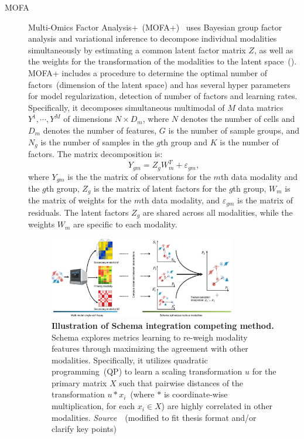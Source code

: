 \begin{description}
  \item[MOFA]
  Multi-Omics Factor Analysis+~(MOFA+)~\citep{argelaguet2020mofa+} uses Bayesian group factor analysis and variational inference to decompose individual modalities simultaneously by estimating a common latent factor matrix $Z$, as well as the weights for the transformation of the modalities to the latent space~(). MOFA+ includes a procedure to determine the optimal number of factors~(dimension of the latent space) and has several hyper parameters for model regularization, detection of number of factors and learning rates. Specifically, it decomposes simultaneous multimodal of $M$ data matrics $Y^1, \cdots, Y^M$ of dimensions $N\times D_m$, where $N$ denotes the number of cells and $D_m$ denotes the number of features, $G$ is the number of sample groups, and $N_g$ is the number of samples in the $g$th group and $K$ is the number of factors. The matrix decomposition is:
  \begin{equation}
  Y_{gm} = Z_gW_m^{T} + \varepsilon_{gm},
  \end{equation}
  where $Y_{gm}$ is the the matrix of observations for the $m$th data modality and the $g$th group, $Z_g$ is the matrix of latent factors for the $g$th group, $W_m$ is the matrix of weights for the $m$th data modality, and $\varepsilon_{gm}$ is the matrix of residuals. The latent factors $Z_g$ are shared across all modalities, while the weights $W_m$ are specific to each modality. %

\begin{figure}[!h]
  	\centering
  	\includegraphics[width=0.8\textwidth]{Alg_Schema/fig}
  	\vspace{0.1cm}
  	\caption[Illustration of Schema integration competing method.]{\textbf{Illustration of Schema integration competing method.} Schema explores metrics learning to re-weigh modality features through maximizing the agreement with other modalities. Specifically, it utilizes quadratic programming~(QP) to learn a scaling transformation $u$ for the primary matrix $X$ such that pairwise distances of the transformation $u * x_i$~(where $*$ is coordinate-wise multiplication, for each $x_i\in X$) are highly correlated in other modalities. \emph{Source~\cite{singh2021schema}}~(modified to fit thesis format and/or clarify key points)
 } 
  	\label{fig:Alg_Schema}
\end{figure} 


\end{description}
